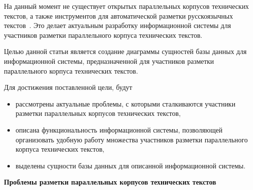\documentclass[a4paper,oneside,14pt]{article}
\begin{document}
На данный момент не существует открытых параллельных корпусов технических текстов, а также инструментов для автоматической разметки русскоязычных текстов~\cite{butenko2020-2, butenko2022}.
Это делает актуальным разработку информационной системы для участников разметки параллельного корпуса технических текстов.

Целью данной статьи является создание диаграммы сущностей базы данных для информационной системы, предназначенной для участников разметки параллельного корпуса технических текстов.

Для достижения поставленной цели, будут
\begin{itemize}
    \item рассмотрены актуальные проблемы, с которыми сталкиваются участники разметки параллельных корпусов технических текстов, 
    \item описана функциональность информационной системы, позволяющей организовать удобную работу множества участников разметки параллельного корпуса технических текстов,
    \item выделены сущности базы данных для описанной информационной системы.
\end{itemize}

\textbf{Проблемы разметки параллельных корпусов технических текстов}

\end{document}
